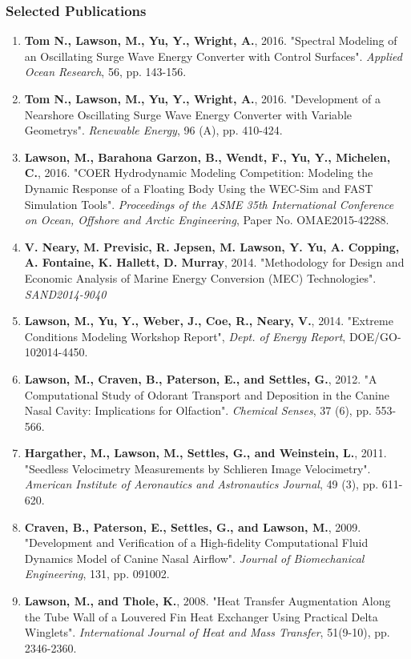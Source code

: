 \documentclass[10pt]{article}
\begin{document}
\subsubsection*{Selected Publications}
\vspace{-0.1in}
\begin{enumerate}[leftmargin=1.5pc,itemsep=0pt,parsep=0pt,topsep=0pt,partopsep=1pt]

\item \textbf{Tom N., Lawson, M., Yu, Y., Wright, A.}, 2016. "Spectral Modeling of an Oscillating Surge Wave Energy Converter with Control Surfaces". \emph{Applied Ocean Research}, 56, pp. 143-156.
\item \textbf{Tom N., Lawson, M., Yu, Y., Wright, A.}, 2016. "Development of a Nearshore Oscillating Surge Wave Energy Converter with Variable Geometrys". \emph{Renewable Energy}, 96 (A), pp. 410-424.
\item \textbf{Lawson, M., Barahona Garzon, B., Wendt, F., Yu, Y., Michelen, C.}, 2016. "COER Hydrodynamic Modeling Competition: Modeling the Dynamic Response of a Floating Body Using the WEC-Sim and FAST Simulation Tools". \emph{Proceedings of the ASME 35th International Conference on Ocean, Offshore and Arctic Engineering}, Paper No. OMAE2015-42288.
\item \textbf{V. Neary, M. Previsic, R. Jepsen, M. Lawson, Y. Yu, A. Copping, A. Fontaine, K. Hallett, D. Murray}, 2014. "Methodology for Design and Economic Analysis of Marine Energy Conversion (MEC) Technologies". \emph{SAND2014-9040}
\item \textbf{Lawson, M., Yu, Y., Weber, J., Coe, R., Neary, V.}, 2014. "Extreme Conditions Modeling Workshop Report", \emph{Dept. of Energy Report}, DOE/GO-102014-4450.
\item \textbf{Lawson, M., Craven, B., Paterson, E., and Settles, G.}, 2012. "A Computational Study of Odorant Transport and Deposition in the Canine Nasal Cavity: Implications for Olfaction". \emph{Chemical Senses}, 37 (6), pp. 553-566.
\item \textbf{Hargather, M., Lawson, M., Settles, G., and Weinstein, L.}, 2011. "Seedless Velocimetry Measurements by Schlieren Image Velocimetry". \emph{American Institute of Aeronautics and Astronautics Journal}, 49 (3), pp. 611-620.
\item \textbf{Craven, B., Paterson, E., Settles, G., and Lawson, M.}, 2009. "Development and Verification of a High-fidelity Computational Fluid Dynamics Model of Canine Nasal Airflow". \emph{Journal of Biomechanical Engineering}, 131, pp. 091002.
\item \textbf{Lawson, M., and Thole, K.}, 2008. "Heat Transfer Augmentation Along the Tube Wall of a Louvered Fin Heat Exchanger Using Practical Delta Winglets". \emph{International Journal of Heat and Mass Transfer}, 51(9-10), pp. 2346-2360.


\end{enumerate}
\end{document}
